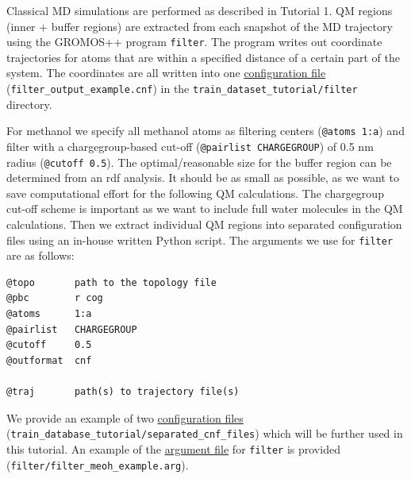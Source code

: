 Classical MD simulations are performed as described in Tutorial 1. QM regions (inner + buffer regions) are extracted from each snapshot of the MD trajectory using the GROMOS++ program \texttt{filter}. The program writes out coordinate trajectories for atoms that are within a specified distance of a certain part of the system. The coordinates are all written into one \href{https://github.com/LierB/gromos_tutorial_livecoms/blob/burnn_tutorial_rc/tutorial_files/t_06/train_dataset_tutorial/filter/filter_output_example.cnf}{configuration file} (\texttt{filter\_output\_example.cnf}) in the \texttt{train\_dataset\_tutorial/filter} directory.

For methanol we specify all methanol atoms as filtering centers (\texttt{@atoms 1:a}) and filter with a chargegroup-based cut-off (\texttt{@pairlist CHARGEGROUP}) of 0.5 nm radius (\texttt{@cutoff 0.5}). The optimal/reasonable size for the buffer region can be determined from an rdf analysis. It should be as small as possible, as we want to save computational effort for the following QM calculations. The chargegroup cut-off scheme is important as we want to include full water molecules in the QM calculations. Then we extract individual QM regions into separated configuration files using an in-house written Python script. The arguments we use for \texttt{filter} are as follows:

\begin{lstlisting}[breaklines=true, breakatwhitespace=false]
@topo       path to the topology file
@pbc        r cog
@atoms      1:a
@pairlist   CHARGEGROUP
@cutoff     0.5
@outformat  cnf

@traj       path(s) to trajectory file(s)
\end{lstlisting}

We provide an example of two \href{https://github.com/LierB/gromos_tutorial_livecoms/tree/burnn_tutorial_rc/tutorial_files/t_06/train_dataset_tutorial/separated_cnf_files}{configuration files} (\texttt{train\_database\_tutorial/separated\_cnf\_files}) which will be further used in this tutorial. An example of the \href{https://github.com/LierB/gromos_tutorial_livecoms/blob/burnn_tutorial_rc/tutorial_files/t_06/train_dataset_tutorial/filter/filter_meoh_example.arg}{argument file} for \texttt{filter} is provided (\texttt{filter/filter\_meoh\_example.arg}).

